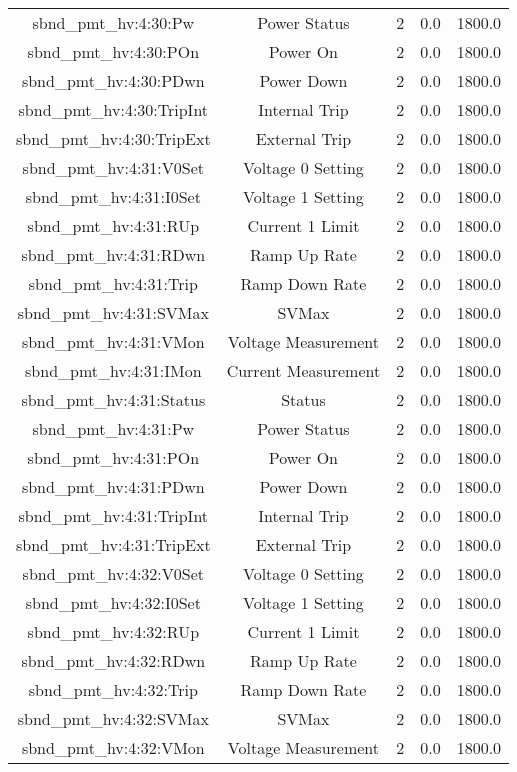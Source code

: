 \begin{table}[ptb]
\begin{tabular}{c | c c c c}
sbnd_pmt_hv:4:30:Pw & Power Status & 2 & 0.0 & 1800.0\\ 
sbnd_pmt_hv:4:30:POn & Power On & 2 & 0.0 & 1800.0\\ 
sbnd_pmt_hv:4:30:PDwn & Power Down & 2 & 0.0 & 1800.0\\ 
sbnd_pmt_hv:4:30:TripInt & Internal Trip & 2 & 0.0 & 1800.0\\ 
sbnd_pmt_hv:4:30:TripExt & External Trip & 2 & 0.0 & 1800.0\\ 
sbnd_pmt_hv:4:31:V0Set & Voltage 0 Setting & 2 & 0.0 & 1800.0\\ 
sbnd_pmt_hv:4:31:I0Set & Voltage 1 Setting & 2 & 0.0 & 1800.0\\ 
sbnd_pmt_hv:4:31:RUp & Current 1 Limit & 2 & 0.0 & 1800.0\\ 
sbnd_pmt_hv:4:31:RDwn & Ramp Up Rate & 2 & 0.0 & 1800.0\\ 
sbnd_pmt_hv:4:31:Trip & Ramp Down Rate & 2 & 0.0 & 1800.0\\ 
sbnd_pmt_hv:4:31:SVMax & SVMax & 2 & 0.0 & 1800.0\\ 
sbnd_pmt_hv:4:31:VMon & Voltage Measurement & 2 & 0.0 & 1800.0\\ 
sbnd_pmt_hv:4:31:IMon & Current Measurement & 2 & 0.0 & 1800.0\\ 
sbnd_pmt_hv:4:31:Status & Status & 2 & 0.0 & 1800.0\\ 
sbnd_pmt_hv:4:31:Pw & Power Status & 2 & 0.0 & 1800.0\\ 
sbnd_pmt_hv:4:31:POn & Power On & 2 & 0.0 & 1800.0\\ 
sbnd_pmt_hv:4:31:PDwn & Power Down & 2 & 0.0 & 1800.0\\ 
sbnd_pmt_hv:4:31:TripInt & Internal Trip & 2 & 0.0 & 1800.0\\ 
sbnd_pmt_hv:4:31:TripExt & External Trip & 2 & 0.0 & 1800.0\\ 
sbnd_pmt_hv:4:32:V0Set & Voltage 0 Setting & 2 & 0.0 & 1800.0\\ 
sbnd_pmt_hv:4:32:I0Set & Voltage 1 Setting & 2 & 0.0 & 1800.0\\ 
sbnd_pmt_hv:4:32:RUp & Current 1 Limit & 2 & 0.0 & 1800.0\\ 
sbnd_pmt_hv:4:32:RDwn & Ramp Up Rate & 2 & 0.0 & 1800.0\\ 
sbnd_pmt_hv:4:32:Trip & Ramp Down Rate & 2 & 0.0 & 1800.0\\ 
sbnd_pmt_hv:4:32:SVMax & SVMax & 2 & 0.0 & 1800.0\\ 
sbnd_pmt_hv:4:32:VMon & Voltage Measurement & 2 & 0.0 & 1800.0\\ 

\end{tabular}
\end{table}
